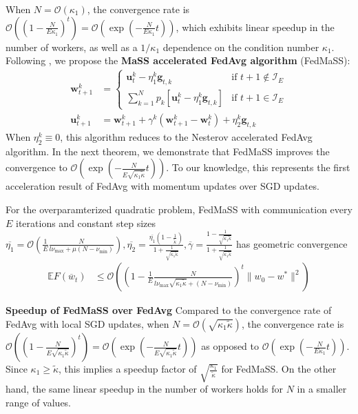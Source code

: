 When $N=\mathcal{O}(\kappa_{1})$, the convergence rate is $\mathcal{O}((1-\frac{N}{E\kappa_{1}})^{t})=\mathcal{O}(\exp(-\frac{N}{E\kappa_{1}}t))$,
which exhibits linear speedup in the number of workers, as well as
a $1/\kappa_{1}$ dependence on the condition number $\kappa_{1}$.
Following \cite{liu2018accelerating}, we propose the \textbf{MaSS
	accelerated FedAvg algorithm} (FedMaSS):
\begin{align*}
\mathbf{w}_{t+1}^{k} & =\begin{cases}
\mathbf{u}_{t}^{k}-\eta_{1}^{k}\mathbf{g}_{t,k} & \text{if }t+1\notin\mathcal{I}_{E}\\
\sum_{k=1}^{N}p_{k}\left[\mathbf{u}_{t}^{k}-\eta_{1}^{k}\mathbf{g}_{t,k}\right] & \text{if }t+1\in\mathcal{I}_{E}
\end{cases}\\
\mathbf{u}_{t+1}^{k} & =\mathbf{w}_{t+1}^{k}+\gamma^{k}(\mathbf{w}_{t+1}^{k}-\mathbf{w}_{t}^{k})+\eta_{2}^{k}\mathbf{g}_{t,k}
\end{align*}
When $\eta_{2}^{k}\equiv0$, this algorithm reduces to the Nesterov
accelerated FedAvg algorithm. In the next theorem, we demonstrate
that FedMaSS improves the convergence to $\mathcal{O}(\exp(-\frac{N}{E\sqrt{\kappa_{1}\tilde{\kappa}}}t))$.
To our knowledge, this represents the first acceleration result of
FedAvg with momentum updates over SGD updates.
\begin{theorem}
	\label{thm:overparameterized_MaSS}For the overparamterized quadratic
	problem, FedMaSS with communication every $E$ iterations and constant
	step sizes $\overline{\eta_{1}}=\mathcal{O}(\frac{1}{E}\frac{N}{l\nu_{\max}+\mu(N-\nu_{\min})}),\overline{\eta_{2}}=\frac{\overline{\eta_{1}}(1-\frac{1}{\tilde{\kappa}})}{1+\frac{1}{\sqrt{\kappa_{1}\tilde{\kappa}}}},\overline{\gamma}=\frac{1-\frac{1}{\sqrt{\kappa_{1}\tilde{\kappa}}}}{1+\frac{1}{\sqrt{\kappa_{1}\tilde{\kappa}}}}$
	has geometric convergence
	\begin{align*}
	\mathbb{E}F(\overline{w}_{t}) & \leq\mathcal{O}\left((1-\frac{1}{E}\frac{N}{l\nu_{\max}\sqrt{\kappa_{1}\tilde{\kappa}}+(N-\nu_{\min})})^{t}\|w_{0}-w^{\ast}\|^{2}\right)
	\end{align*}
\end{theorem}
\textbf{Speedup of FedMaSS over FedAvg} Compared to the convergence
rate of FedAvg with local SGD updates, when $N=\mathcal{O}(\sqrt{\kappa_{1}\tilde{\kappa}})$,
the convergence rate is $\mathcal{O}((1-\frac{N}{E\sqrt{\kappa_{1}\tilde{\kappa}}})^{t})=\mathcal{O}(\exp(-\frac{N}{E\sqrt{\kappa_{1}\tilde{\kappa}}}t))$
as opposed to $\mathcal{O}(\exp(-\frac{N}{E\kappa_{1}}t))$. Since
$\kappa_{1}\geq\tilde{\kappa}$, this implies a speedup factor of
$\sqrt{\frac{\kappa_{1}}{\tilde{\kappa}}}$ for FedMaSS. On the other
hand, the same linear speedup in the number of workers holds for $N$
in a smaller range of values. 